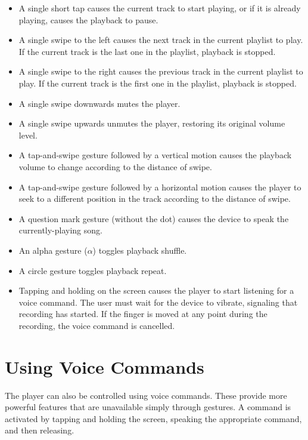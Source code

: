 \documentclass[12pt,letterpaper]{article}
\begin{document}
\begin{itemize}
\item A single short tap causes the current track to start playing, or if it is already playing, causes the playback to pause.
\item A single swipe to the left causes the next track in the current playlist to play. If the current track is the last one in the playlist, playback is stopped.
\item A single swipe to the right causes the previous track in the current playlist to play. If the current track is the first one in the playlist, playback is stopped.
\item A single swipe downwards mutes the player.
\item A single swipe upwards unmutes the player, restoring its original volume level.
\item {\color{red} A tap-and-swipe gesture followed by a vertical motion causes the playback volume to change according to the distance of swipe.}
\item {\color{red} A tap-and-swipe gesture followed by a horizontal motion causes the player to seek to a different position in the track according to the distance of swipe.}
\item {\color{red} A question mark gesture (without the dot) causes the device to speak the currently-playing song.}
\item {\color{red} An alpha gesture ($\alpha$) toggles playback shuffle.}
\item {\color{red} A circle gesture toggles playback repeat.}
\item Tapping and holding on the screen causes the player to start listening for a voice command. The user must wait for the device to vibrate, signaling that recording has started. If the finger is moved at any point during the recording, the voice command is cancelled. 
\end{itemize}

\section{Using Voice Commands}

The player can also be controlled using voice commands. These provide more powerful features that are unavailable simply through gestures. A command is activated by tapping and holding the screen, speaking the appropriate command, and then releasing.
\end{document}
